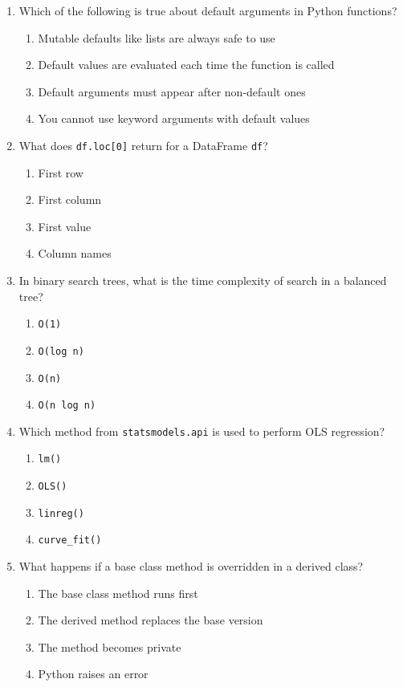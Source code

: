 \documentclass[12pt]{article}
\begin{document}
\begin{enumerate}[label=\arabic*.]
\item Which of the following is true about default arguments in Python functions?  
\begin{enumerate}[label=\Alph*.]
\item Mutable defaults like lists are always safe to use  
\item Default values are evaluated each time the function is called  
\item Default arguments must appear after non-default ones  
\item You cannot use keyword arguments with default values  
\end{enumerate}

\item What does \texttt{df.loc[0]} return for a DataFrame \texttt{df}?  
\begin{enumerate}[label=\Alph*.]
\item First row
\item First column
\item First value
\item Column names
\end{enumerate}

\item In binary search trees, what is the time complexity of search in a balanced tree?  
\begin{enumerate}[label=\Alph*.]
\item \texttt{O(1)}
\item \texttt{O(log n)}
\item \texttt{O(n)}
\item \texttt{O(n log n)}
\end{enumerate}

\item Which method from \texttt{statsmodels.api} is used to perform OLS regression?  
\begin{enumerate}[label=\Alph*.]
\item \texttt{lm()}
\item \texttt{OLS()}
\item \texttt{linreg()}
\item \texttt{curve\_fit()}
\end{enumerate}

\item What happens if a base class method is overridden in a derived class?  
\begin{enumerate}[label=\Alph*.]
\item The base class method runs first  
\item The derived method replaces the base version  
\item The method becomes private  
\item Python raises an error  
\end{enumerate}


\end{enumerate}
\end{document}
